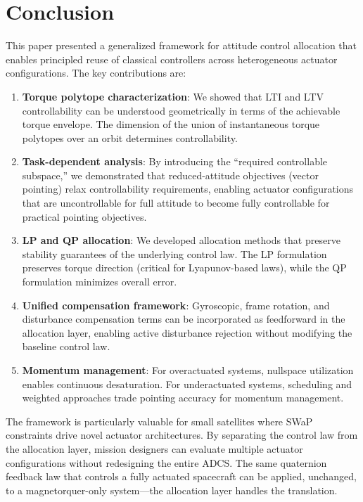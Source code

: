 \documentclass[conference]{IEEEtran}
\begin{document}
\section{Conclusion}\label{sec:conclusion}

This paper presented a generalized framework for attitude control allocation that enables principled reuse of classical controllers across heterogeneous actuator configurations. The key contributions are:

\begin{enumerate}
    \item \textbf{Torque polytope characterization}: We showed that LTI and LTV controllability can be understood geometrically in terms of the achievable torque envelope. The dimension of the union of instantaneous torque polytopes over an orbit determines controllability.

    \item \textbf{Task-dependent analysis}: By introducing the ``required controllable subspace,'' we demonstrated that reduced-attitude objectives (vector pointing) relax controllability requirements, enabling actuator configurations that are uncontrollable for full attitude to become fully controllable for practical pointing objectives.

    \item \textbf{LP and QP allocation}: We developed allocation methods that preserve stability guarantees of the underlying control law. The LP formulation preserves torque direction (critical for Lyapunov-based laws), while the QP formulation minimizes overall error.

    \item \textbf{Unified compensation framework}: Gyroscopic, frame rotation, and disturbance compensation terms can be incorporated as feedforward in the allocation layer, enabling active disturbance rejection without modifying the baseline control law.

    \item \textbf{Momentum management}: For overactuated systems, nullspace utilization enables continuous desaturation. For underactuated systems, scheduling and weighted approaches trade pointing accuracy for momentum management.
\end{enumerate}

The framework is particularly valuable for small satellites where SWaP constraints drive novel actuator architectures. By separating the control law from the allocation layer, mission designers can evaluate multiple actuator configurations without redesigning the entire ADCS. The same quaternion feedback law that controls a fully actuated spacecraft can be applied, unchanged, to a magnetorquer-only system---the allocation layer handles the translation.
\end{document}
